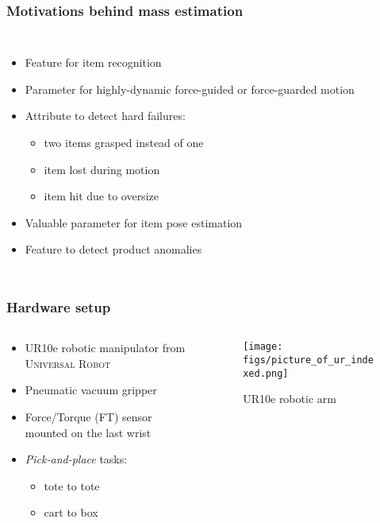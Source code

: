 \documentclass[aspectratio=1610]{beamer}
\begin{document}
\begin{frame}
\frametitle{Motivations behind mass estimation}
\begin{columns}
\column{37em}
\begin{itemize}\itemsep1em
  \justifying
  \item Feature for \textcolor{Ocean}{item recognition}
  \item Parameter for highly-dynamic \textcolor{Ocean}{force-guided} or \textcolor{Ocean}{force-guarded motion}
  \item Attribute to detect \textcolor{Ocean}{hard failures}:
  \begin{itemize}\itemsep1em
    \justifying
    \item two items grasped instead of one
    \item item lost during motion
    \item item hit due to oversize
  \end{itemize}
  \item Valuable parameter for \textcolor{Ocean}{item pose estimation}
  \item Feature to detect \textcolor{Ocean}{product anomalies}
\end{itemize}
\end{columns}
\end{frame}

\begin{frame}
\frametitle{Hardware setup}
\begin{columns}
\begin{column}{0.5\textwidth}
  \begin{itemize}\itemsep1em
    \justifying
    \item UR10e robotic manipulator from \textsc{Universal Robot}
    \item Pneumatic \textcolor{Ocean}{vacuum gripper}
    \item Force/Torque (FT) sensor mounted on the \textcolor{Ocean}{last wrist}
    \item \textit{Pick-and-place} tasks:
    \begin{itemize}\itemsep0.0em
      \justifying
      \item tote to tote
      \item cart to box
    \end{itemize}
  \end{itemize}
\end{column}
\begin{column}{0.5\textwidth}  %
  \begin{figure}
    \centering
    \texttt{[image: figs/picture\_of\_ur\_indexed.png]}
    \caption{UR10e robotic arm}
  \end{figure}
\end{column}
\end{columns}

\end{frame}
\end{document}
